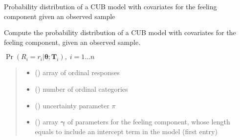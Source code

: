 \documentclass[letterpaper,10pt,english]{sphinxmanual}
\begin{document}

\begin{fulllineitems}
\label{\detokenize{cubmods:cubmods.cub_0w.prob}}
\pysigstartsignatures
{}
\pysigstopsignatures
\sphinxAtStartPar
Probability distribution of a CUB model with covariates for the feeling component
given an observed sample

\sphinxAtStartPar
Compute the probability distribution of a CUB model with covariates
for the feeling component, given an observed sample.

\sphinxAtStartPar
\(\Pr(R_i=r_i|\pmb\theta;\pmb T_i),\; i=1 \ldots n\)
\begin{quote}\begin{description}
\begin{itemize}
\item {} 
\sphinxAtStartPar
{} () \textendash{} array of ordinal responses

\item {} 
\sphinxAtStartPar
{} () \textendash{} number of ordinal categories

\item {} 
\sphinxAtStartPar
{} () \textendash{} uncertainty parameter \(\pi\)

\item {} 
\sphinxAtStartPar
{} () \textendash{} array \(\pmb \gamma\) of parameters for the feeling component, whose length equals 
 to include an intercept term in the model (first entry)


\end{itemize}
\end{description}
\end{quote}
\end{fulllineitems}
\end{document}

